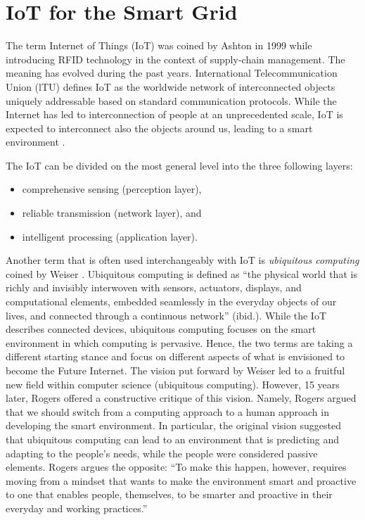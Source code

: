 \section{IoT for the Smart Grid}
\label{sec:IoTSG}
The term Internet of Things (IoT) was coined by Ashton in 1999 \cite{ashton2011internet} while introducing RFID technology in the context of supply-chain management. The meaning has evolved during the past years. International Telecommunication Union (lTU) defines IoT as the worldwide network of interconnected objects uniquely addressable based on standard communication protocols. While the Internet has led to interconnection of people at an unprecedented scale, IoT is expected to interconnect also the objects around us, leading to a smart environment \cite{gubbi2013internet}.	

The IoT can be divided on the most general level into the three following layers:
\begin{itemize}
\item comprehensive sensing (perception layer),
\item reliable transmission (network layer), and
\item intelligent processing (application layer).
\end{itemize}
	
Another term that is often used interchangeably with IoT is \textit{ubiquitous computing} coined by Weiser \cite{weiser1991computer}. Ubiquitous computing is defined as ``the physical world that is richly and invisibly interwoven with sensors, actuators, displays, and computational elements, embedded seamlessly in the everyday objects of our lives, and connected through a continuous network'' (ibid.). While the IoT describes connected devices, ubiquitous computing focuses on the smart environment in which computing is pervasive. Hence, the two terms are taking a different starting stance and focus on different aspects of what is envisioned to become the Future Internet. 
The vision put forward by Weiser \cite{weiser1991computer} led to a fruitful new field within computer science (ubiquitous computing). However, 15 years later, Rogers \cite{rogers2006moving} offered a constructive critique of this vision. Namely, Rogers argued that we should switch from a computing approach to a human approach in developing the smart environment. In particular, the original vision suggested that ubiquitous computing can lead to an environment that is predicting and adapting to the people's needs, while the people were considered passive elements. Rogers argues the opposite: ``To make this happen, however, requires moving from a mindset that wants to make the  environment smart and proactive to one that enables people, themselves, to be smarter and proactive in their everyday and working practices.''

